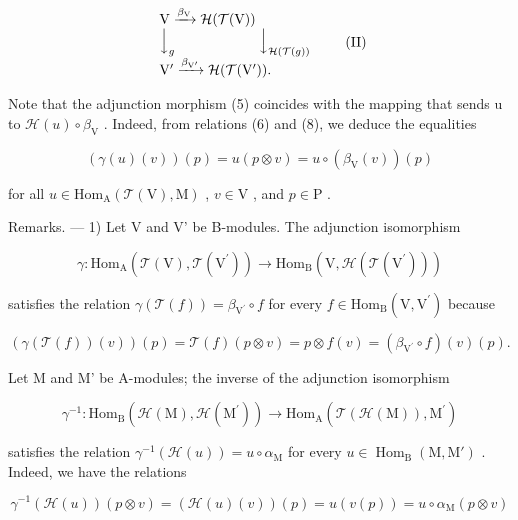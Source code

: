 \[
\begin{array}{l} \mathrm{V} \xrightarrow {\beta_ {\mathrm{V}}} \mathcal {H} (\mathcal {T} (\mathrm{V})) \\ \Big \downarrow_ {g} \qquad \qquad \qquad \Big \downarrow_ {\mathcal {H} (\mathcal {T} (g))} \\ \mathrm{V} ^ {\prime} \xrightarrow {\beta_ {\mathrm{V} ^ {\prime}}} \mathcal {H} (\mathcal {T} (\mathrm{V} ^ {\prime})). \end{array}\tag{II}
\]

Note that the adjunction morphism (5) coincides with the mapping that sends u to \(\mathcal{H}(u)\circ\beta_{\mathrm{V}}\) . Indeed, from relations (6) and (8), we deduce the equalities

\[
(\gamma (u) (v)) (p) = u (p \otimes v) = u \circ (\beta_ {\mathrm{V}} (v)) (p)
\]

for all \(u \in \mathrm{Hom}_{\mathrm{A}}(\mathcal{T}(\mathrm{V}), \mathrm{M})\) , \(v \in \mathrm{V}\) , and \(p \in \mathrm{P}\) .

Remarks. --- 1) Let V and V' be B-modules. The adjunction isomorphism

\[
\gamma : \mathrm{Hom} _ {\mathrm{A}} (\mathcal {T} (\mathrm{V}), \mathcal {T} (\mathrm{V} ^ {\prime})) \longrightarrow \mathrm{Hom} _ {\mathrm{B}} (\mathrm{V}, \mathcal {H} (\mathcal {T} (\mathrm{V} ^ {\prime})))
\]

satisfies the relation \(\gamma (\mathcal{T}(f)) = \beta_{\mathrm{V}^{\prime}}\circ f\) for every \(f\in \mathrm{Hom}_{\mathrm{B}}(\mathrm{V},\mathrm{V}^{\prime})\) because

\[
(\gamma (\mathcal {T} (f)) (v)) (p) = \mathcal {T} (f) (p \otimes v) = p \otimes f (v) = (\beta_ {\mathrm{V} ^ {\prime}} \circ f) (v) (p).
\]

Let M and M' be A-modules; the inverse of the adjunction isomorphism

\[
\gamma^ {- 1}: \mathrm{Hom} _ {\mathrm{B}} (\mathcal {H} (\mathrm{M}), \mathcal {H} (\mathrm{M} ^ {\prime})) \longrightarrow \mathrm{Hom} _ {\mathrm{A}} (\mathcal {T} (\mathcal {H} (\mathrm{M})), \mathrm{M} ^ {\prime})
\]

satisfies the relation \(\gamma^{-1}(\mathcal{H}(u)) = u \circ \alpha_{\mathrm{M}}\) for every \(u \in \operatorname{Hom}_{\mathrm{B}}(\mathrm{M}, \mathrm{M}')\) . Indeed, we have the relations

\[
\gamma^ {- 1} (\mathcal {H} (u)) (p \otimes v) = (\mathcal {H} (u) (v)) (p) = u (v (p)) = u \circ \alpha_ {\mathrm{M}} (p \otimes v)
\]

